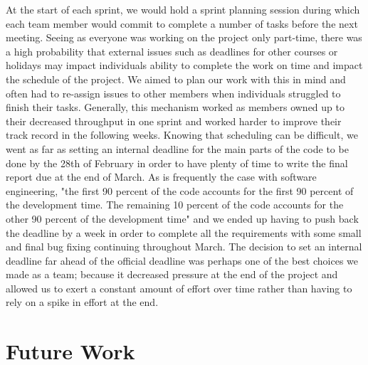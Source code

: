 \documentclass[a4paper]{report}
\begin{document}
	\par At the start of each sprint, we would hold a sprint planning session during which each team member would commit to complete a number of tasks before the next meeting. Seeing as everyone was working on the project only part-time, there was a high probability that external issues such as deadlines for other courses or holidays may impact individuals ability to complete the work on time and impact the schedule of the project. We aimed to plan our work with this in mind and often had to re-assign issues to other members when individuals struggled to finish their tasks. Generally, this mechanism worked as members owned up to their decreased throughput in one sprint and worked harder to improve their track record in the following weeks. Knowing that scheduling can be difficult, we went as far as setting an internal deadline for the main parts of the code to be done by the 28th of February in order to have plenty of time to write the final report due at the end of March. As is frequently the case with software engineering, "the first 90 percent of the code accounts for the first 90 percent of the development time. The remaining 10 percent of the code accounts for the other 90 percent of the development time" \cite{bentley_programmimg_1985} and we ended up having to push back the deadline by a week in order to complete all the requirements with some small and final bug fixing continuing throughout March. The decision to set an internal deadline far ahead of the official deadline was perhaps one of the best choices we made as a team; because it decreased pressure at the end of the project and allowed us to exert a constant amount of effort over time rather than having to rely on a spike in effort at the end.\newline
	
	\section{Future Work}
	
\end{document}
